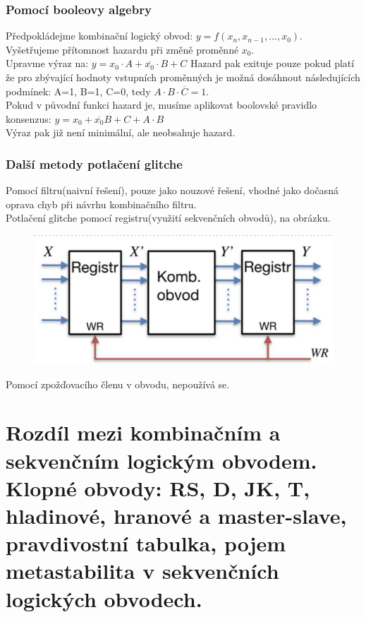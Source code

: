 \subsubsection{Pomocí booleovy algebry}
Předpokládejme kombinační logický obvod: \(y = f(x_n,x_{n-1},...,x_0)\).\\
Vyšetřujeme přítomnost hazardu při změně proměnné \(x_0\).\\
Upravme výraz na: \(y = x_0\cdot A + \overline{x_0}\cdot B + C\)
Hazard pak exituje pouze pokud platí že pro zbývající hodnoty vstupních proměnných je možná dosáhnout následujících podmínek: A=1, B=1, C=0, tedy \(A\cdot B \cdot \overline{C} = 1\).\\
Pokud v původní funkci hazard je, musíme aplikovat boolovské pravidlo konsenzus: \(y = x_0 + \overline{x_0}B + C + A\cdot B\)\\
Výraz pak již není minimální, ale neobsahuje hazard.\\

\subsubsection{Další metody potlačení glitche}
Pomocí filtru(naivní řešení), pouze jako nouzové řešení, vhodné jako dočasná oprava chyb při návrhu kombinačního filtru.\\
Potlačení glitche pomocí registru(využití sekvenčních obvodů), na obrázku.\\
\begin{figure}[h!]
    \centering
    \includegraphics*[scale = 0.5]{img/HazElim.png}
\end{figure}
Pomocí zpožďovacího členu v obvodu, nepoužívá se.

\section{Rozdíl mezi kombinačním a sekvenčním logickým obvodem. Klopné obvody: RS, D, JK, T, hladinové, hranové a master-slave, pravdivostní tabulka, pojem metastabilita v sekvenčních logických obvodech.}

